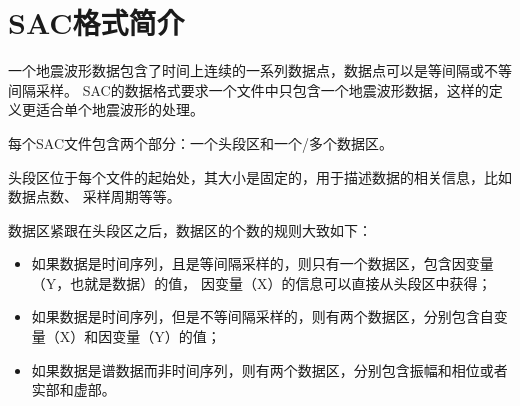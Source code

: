 \section{SAC格式简介}
一个地震波形数据包含了时间上连续的一系列数据点，数据点可以是等间隔或不等间隔采样。
SAC的数据格式要求一个文件中只包含一个地震波形数据，这样的定义更适合单个地震波形的处理。

每个SAC文件包含两个部分：一个头段区和一个/多个数据区。

头段区位于每个文件的起始处，其大小是固定的，用于描述数据的相关信息，比如数据点数、
采样周期等等。

数据区紧跟在头段区之后，数据区的个数的规则大致如下：
\begin{itemize}
\item 如果数据是时间序列，且是等间隔采样的，则只有一个数据区，包含因变量（Y，也就是数据）的值，
    因变量（X）的信息可以直接从头段区中获得；
\item 如果数据是时间序列，但是不等间隔采样的，则有两个数据区，分别包含自变量（X）和因变量（Y）的值；
\item 如果数据是谱数据而非时间序列，则有两个数据区，分别包含振幅和相位或者实部和虚部。
\end{itemize}
